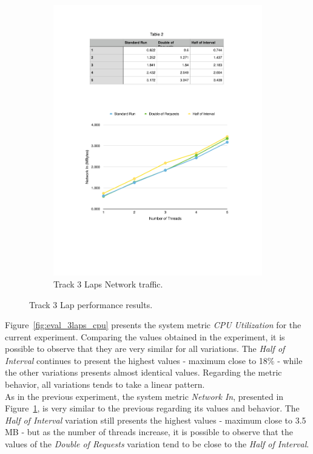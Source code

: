 \begin{figure}[ht!]
\begin{subfigure}{.5\textwidth}
  \includegraphics[width=\linewidth]{./images/network_3_lap}
  \caption{Track 3 Laps Network traffic.}
  \label{fig:eval_3laps_network}
\end{subfigure}
\caption{Track 3 Lap performance results.}
\label{fig:eval_3laps_results}
\end{figure}

Figure~\ref{fig:eval_3laps_cpu} presents the system metric \textit{CPU Utilization} for the current
experiment. Comparing the values obtained in the experiment, it is possible to observe that
they are very similar for all variations. The \textit{Half of Interval} continues to present
the highest values - maximum close to 18$\%$ - while the other variations presents almost identical
values. Regarding the metric behavior, all variations tends to take a linear pattern.\\

As in the previous experiment, the system metric \textit{Network In}, presented in Figure~\ref{fig:eval_3laps_network},
is very similar to the previous regarding its values and behavior. The \textit{Half of Interval}
variation still presents the highest values - maximum close to 3.5 \gls{MB} - but as the number of
threads increase, it is possible to observe that the values of the \textit{Double of Requests}
variation tend to be close to the \textit{Half of Interval}.


